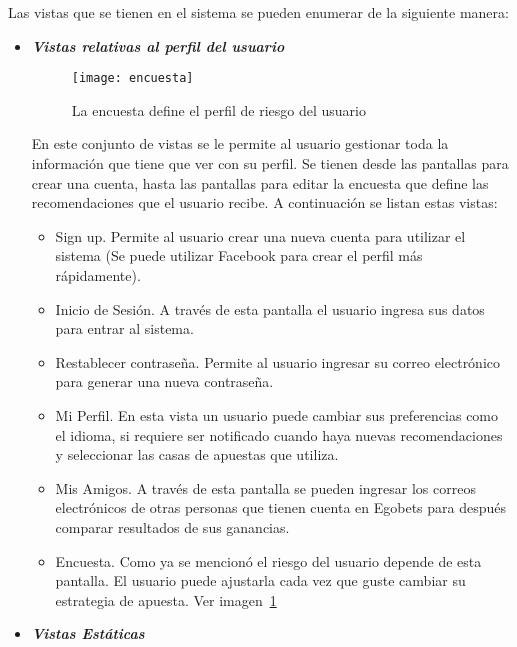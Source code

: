 		Las vistas que se tienen en el sistema se pueden enumerar de la siguiente manera:
		\begin{itemize}
			\item \emph{\textbf{Vistas relativas al perfil del usuario}}
			
			\begin{figure}[!htb]\centering
			   \begin {minipage}{0.7\textwidth}
			     \texttt{[image: encuesta]}
			     \caption{La encuesta define el perfil de riesgo del usuario}\label{Fig:encuesta}
			   \end{minipage}
			\end{figure}
			
			En este conjunto de vistas se le permite al usuario gestionar toda la información que tiene que ver con su perfil. Se tienen desde las pantallas para crear una cuenta, hasta las pantallas para editar la encuesta que define las recomendaciones que el usuario recibe.
			A continuación se listan estas vistas:
			\begin{itemize}
				\item Sign up. Permite al usuario crear una nueva cuenta para utilizar el sistema (Se puede utilizar Facebook para crear el perfil más rápidamente).
				\item Inicio de Sesión. A través de esta pantalla el usuario ingresa sus datos para entrar al sistema.
				\item Restablecer contraseña. Permite al usuario ingresar su correo electrónico para generar una nueva contraseña.
				\item Mi Perfil. En esta vista un usuario puede cambiar sus preferencias como el idioma, si requiere ser notificado cuando haya nuevas recomendaciones y seleccionar las casas de apuestas que utiliza.
				\item Mis Amigos. A través de esta pantalla se pueden ingresar los correos electrónicos de otras personas que tienen cuenta en Egobets para después comparar resultados de sus ganancias.
				\item Encuesta. Como ya se mencionó el riesgo del usuario depende de esta pantalla. El usuario puede ajustarla cada vez que guste cambiar su estrategia de apuesta. Ver imagen~\ref{Fig:encuesta}

				
			\end{itemize}
			
			
			\item \emph{\textbf{Vistas Estáticas}}
			


\end{itemize}
